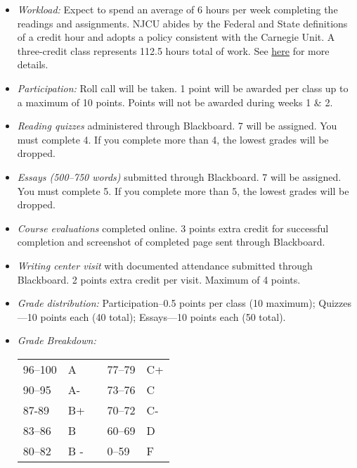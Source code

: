 \documentclass[article,oneside]{memoir}
\begin{document}
\begin{itemize}
\item \textit{Workload:} Expect to spend an average of 6 hours per week completing the readings and assignments. NJCU abides by the Federal and State definitions of a credit hour and adopts a policy consistent with the Carnegie Unit. A three-credit class represents 112.5 hours total of work. See \href{http://scottoconnor.org/resources/Credit.pdf}{here} for more details.

\item \textit{Participation:} Roll call will be taken. 1 point will be awarded per class up to a maximum of 10 points. Points will not be awarded during weeks 1 \& 2. 

\item \textit{Reading quizzes} administered through Blackboard. 7 will be assigned. You must complete 4. If you complete more than 4, the lowest grades will be dropped. 


\item \textit{Essays (500--750 words)} submitted through Blackboard.  7 will be assigned. You must complete 5. If you complete more than 5, the lowest grades will be dropped. 

\item \textit{Course evaluations} completed online. 3 points extra credit for successful completion  and screenshot of completed page sent through Blackboard. 

\item \textit{Writing center visit} with documented attendance submitted through Blackboard. 2 points extra credit per visit. Maximum of 4 points.  
  
\item \textit{Grade distribution:} Participation--0.5 points per class (10 maximum); Quizzes---10 points each (40 total);  Essays---10 points each (50 total).


\item \textit{Grade Breakdown:}

 \begin{tabular}{ | l | l | p{2cm} | l | l | }
    \hline 
96--100 & A  & &  77--79 &  C+ \\  
90--95 & A- & &  73--76 & C \\
87-89 & B+ &  &  70--72 & C- \\ 
83--86 & B  & &  60--69 & D\\
80--82 & B - & & 0--59 & F\\ \hline
    \end{tabular}


\end{itemize}
\end{document}
